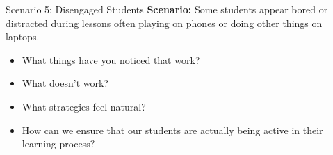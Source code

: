 \documentclass[dvipsnames]{beamer}
\begin{document}

\begin{frame}{Scenario 5: Disengaged Students}
\textbf{Scenario:} Some students appear bored or distracted during lessons often playing on phones or doing other things on laptops.  
\begin{itemize}
    \item What things have you noticed that work?
    \item What doesn’t work?
    \item What strategies feel natural?
    \item How can we ensure that our students are actually being active in their learning process?
\end{itemize}
\end{frame}
\end{document}
